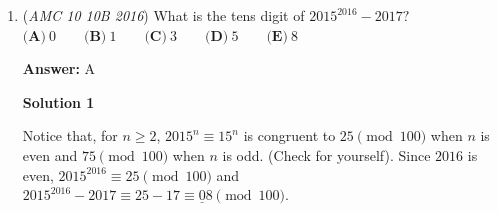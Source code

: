 \begin{enumerate}
 \textbf{Answer: }C



\textbf{Solution 1}

We can set up a system of equations where $x$ and $y$ are the two acute angles. WLOG, assume that $x$ $<$ $y$ in order for the complement of $x$ to be greater than the complement of $y$. Therefore, $5x$ $=$ $4y$ and $90$ $-$ $x$ $=$ $2$ $(90$ $-$ $y)$. Solving for $y$ in the first equation and substituting into the second equation yields
 \[\begin{split} 90 - x & = 2 (90 - 1.25x) \\ 1.5x & = 90 \\ x & = 60 \end{split}\]

 Substituting this $x$ value back into the first equation yields $y$ $=$ $75$, leaving $x$ $+$ $y$ equal to $\boxed{\textbf{(C)}\ 135}$.

 (Solution by akaashp11)

 



\textbf{Solution 2}

We let the measures be $5x$ and $4x$ giving us the ratio of $5:4$. We know $90-4x>90-5x$ since this inequality gives $x>0$, which is true since the measures of angles are never negative. We also know the bigger complement is twice the smaller, so 

 $90-4x=2(90-5x)$
$90-4x=180-10x$
$6x=90$
$x=15$

 Therefore, the angles are $75$ and $60$, which sum to $\boxed{\textbf{(C)}\ 135}$.

 


 


 


	\item (\textit{AMC 10 10B 2016}) What is the tens digit of $2015^{2016}-2017?$
$\textbf{(A)}\ 0 \qquad \textbf{(B)}\ 1 \qquad \textbf{(C)}\ 3 \qquad \textbf{(D)}\ 5 \qquad \textbf{(E)}\ 8$

 \textbf{Answer: }A



\textbf{Solution 1}

Notice that, for $n\ge 2$, $2015^n\equiv 15^n$ is congruent to $25\pmod{100}$ when $n$ is even and $75\pmod{100}$ when $n$ is odd. (Check for yourself).  Since $2016$ is even, $2015^{2016} \equiv 25\pmod{100}$ and $2015^{2016}-2017 \equiv 25 - 17 \equiv \underline{0}8\pmod{100}$.


\end{enumerate}

